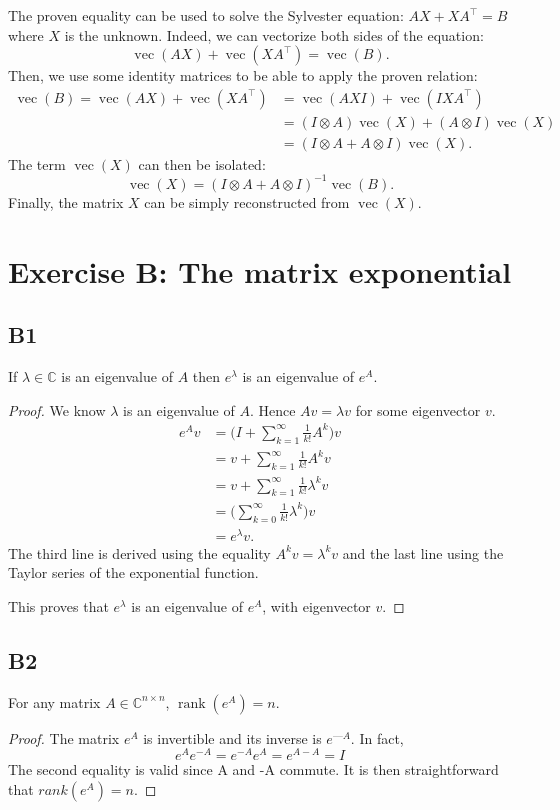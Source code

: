\documentclass[11pt]{article}
\DeclareMathOperator{\rank}{rank}
\DeclareMathOperator{\vect}{vec}
\newcommand{\complex}{\mathbb{C}} %
\newcommand{\kp}{\otimes} %
\begin{document}
The proven equality can be used to solve the Sylvester equation: $AX+XA^\top=B$ where $X$ is the unknown.
Indeed, we can vectorize both sides of the equation:
\[
    \vect(AX) + \vect(XA^\top)=\vect(B).
\]
Then, we use some identity matrices to be able to apply the proven relation:
\begin{align*}
    \vect(B) = \vect(AX) + \vect(XA^\top) &= \vect(AXI) + \vect(IXA^\top)\\
    &=(I\kp A)\vect(X) + (A\kp I) \vect(X)\\
    &=(I\kp A + A\kp I) \vect(X).
\end{align*}
The term $\vect(X)$ can then be isolated:
\[
    \vect(X)=(I\kp A + A\kp I)^{-1}\vect(B).
\]
Finally, the matrix \(X\) can be simply reconstructed from $\vect(X)$.

\section{Exercise B: The matrix exponential}
\subsection*{B1}
If $\lambda\in \complex$ is an eigenvalue of \(A\) then $e^\lambda$ is an eigenvalue of $e^A$.
\begin{proof}
We know $\lambda$ is an eigenvalue of \(A\).
Hence $Av=\lambda v$ for some eigenvector $v$.
\begin{align*}
    e^Av&=\Bigg(I+\sum^{\infty}_{k=1}\frac{1}{k!}A^k\Bigg)v\\
    &=v+\sum^{\infty}_{k=1}\frac{1}{k!}A^kv\\
    &=v+\sum^{\infty}_{k=1}\frac{1}{k!}\lambda^kv\\
    &=\Bigg(\sum^{\infty}_{k=0}\frac{1}{k!}\lambda^k\Bigg)v\\
    &=e^\lambda v.
\end{align*}
The third line is derived using the equality $A^kv=\lambda^kv$ and the last line using the Taylor series of the exponential function.

This proves that $e^\lambda$ is an eigenvalue of $e^A$, with eigenvector \(v\).
\end{proof}

\subsection*{B2}
For any matrix $A\in \complex^{n\times n}$, $\rank(e^A)=n$.
\begin{proof}
The matrix $e^A$ is invertible and its inverse is $e^{—A}$. In fact,
\begin{equation*}
    e^{A}e^{-A}=e^{-A}e^{A}=e^{A-A}=I
\end{equation*}
The second equality is valid since A and -A commute. It is then straightforward that $rank(e^A)=n$.
\end{proof}
\end{document}
